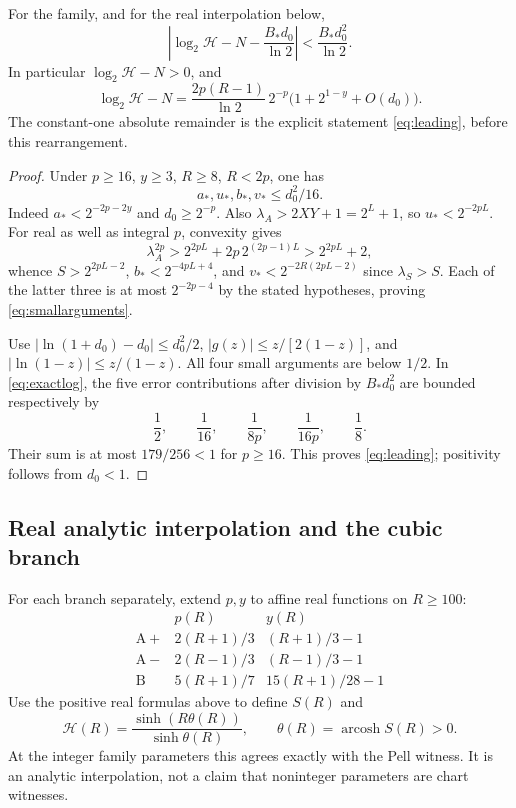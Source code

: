 \begin{proposition}\label{prop:leading}
For the family, and for the real interpolation below,
\begin{equation}\label{eq:leading}
 \left|\log_2\mathcal H-N-\frac{B_*d_0}{\ln2}\right|
 <\frac{B_*d_0^2}{\ln2}.
\end{equation}
In particular $\log_2\mathcal H-N>0$, and
\[
 \log_2\mathcal H-N=
 \frac{2p(R-1)}{\ln2}\,2^{-p}
 \bigl(1+2^{1-y}+O(d_0)\bigr).
\]
The constant-one absolute remainder is the explicit statement
\eqref{eq:leading}, before this rearrangement.
\end{proposition}
\begin{proof}
Under $p\ge16$, $y\ge3$, $R\ge8$, $R<2p$, one has
\begin{equation}\label{eq:smallarguments}
 a_*,u_*,b_*,v_*\le d_0^2/16.
\end{equation}
Indeed $a_*<2^{-2p-2y}$ and $d_0\ge2^{-p}$.
Also $\lambda_A>2XY+1=2^L+1$, so
$u_*<2^{-2pL}$. For real as well as integral $p$, convexity gives
\[
 \lambda_A^{2p}>2^{2pL}+2p\,2^{(2p-1)L}>2^{2pL}+2,
\]
whence $S>2^{2pL-2}$, $b_*<2^{-4pL+4}$, and
$v_*<2^{-2R(2pL-2)}$ since $\lambda_S>S$.
Each of the latter three is at most $2^{-2p-4}$ by the stated
hypotheses, proving \eqref{eq:smallarguments}.

Use $|\ln(1+d_0)-d_0|\le d_0^2/2$,
$|g(z)|\le z/[2(1-z)]$, and
$|\ln(1-z)|\le z/(1-z)$. All four small arguments are below
$1/2$. In \eqref{eq:exactlog}, the five error contributions after
division by $B_*d_0^2$ are bounded respectively by
\[
 \frac12,\qquad\frac1{16},\qquad\frac1{8p},\qquad
 \frac1{16p},\qquad\frac18.
\]
Their sum is at most $179/256<1$ for $p\ge16$.
This proves \eqref{eq:leading}; positivity follows from $d_0<1$.
\end{proof}

\subsection{Real analytic interpolation and the cubic branch}
For each branch separately, extend $p,y$ to affine real functions on
$R\ge100$:
\[
\begin{array}{c|cc}
&p(R)&y(R)\\\hline
\mathrm A+&2(R+1)/3&(R+1)/3-1\\
\mathrm A-&2(R-1)/3&(R-1)/3-1\\
\mathrm B&5(R+1)/7&15(R+1)/28-1
\end{array}
\]
Use the positive real formulas above to define $S(R)$ and
\[
 \mathcal H(R)=\frac{\sinh(R\theta(R))}{\sinh\theta(R)},\qquad
 \theta(R)=\operatorname{arcosh}S(R)>0.
\]
At the integer family parameters this agrees exactly with the Pell
witness. It is an analytic interpolation, not a claim that noninteger
parameters are chart witnesses.

